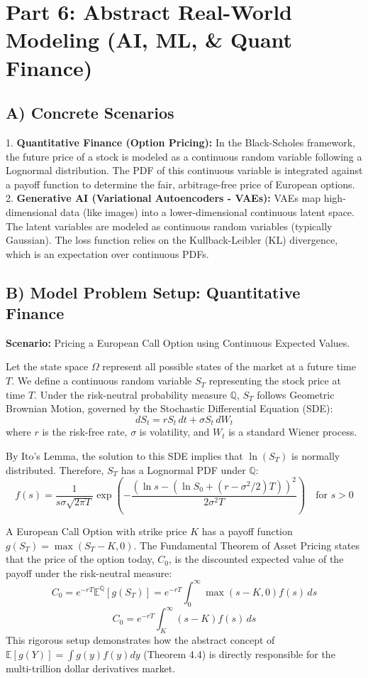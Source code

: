 \documentclass[11pt, a4paper]{article}
\theoremstyle{definition}
\theoremstyle{remark}
\newcommand{\E}{\mathbb{E}}
\begin{document}
\section{Part 6: Abstract Real-World Modeling (AI, ML, \& Quant Finance)}

\subsection{A) Concrete Scenarios}
1. \textbf{Quantitative Finance (Option Pricing):} In the Black-Scholes framework, the future price of a stock is modeled as a continuous random variable following a Lognormal distribution. The PDF of this continuous variable is integrated against a payoff function to determine the fair, arbitrage-free price of European options.
2. \textbf{Generative AI (Variational Autoencoders - VAEs):} VAEs map high-dimensional data (like images) into a lower-dimensional continuous latent space. The latent variables are modeled as continuous random variables (typically Gaussian). The loss function relies on the Kullback-Leibler (KL) divergence, which is an expectation over continuous PDFs.

\subsection{B) Model Problem Setup: Quantitative Finance}
\textbf{Scenario:} Pricing a European Call Option using Continuous Expected Values.

Let the state space $\Omega$ represent all possible states of the market at a future time $T$. We define a continuous random variable $S_T$ representing the stock price at time $T$. Under the risk-neutral probability measure $\mathbb{Q}$, $S_T$ follows Geometric Brownian Motion, governed by the Stochastic Differential Equation (SDE):
\[ dS_t = r S_t \, dt + \sigma S_t \, dW_t \]
where $r$ is the risk-free rate, $\sigma$ is volatility, and $W_t$ is a standard Wiener process.

By Ito's Lemma, the solution to this SDE implies that $\ln(S_T)$ is normally distributed. Therefore, $S_T$ has a Lognormal PDF under $\mathbb{Q}$:
\[ f(s) = \frac{1}{s \sigma \sqrt{2\pi T}} \exp\left( -\frac{(\ln s - (\ln S_0 + (r - \sigma^2/2)T))^2}{2\sigma^2 T} \right) \quad \text{for } s > 0 \]

A European Call Option with strike price $K$ has a payoff function $g(S_T) = \max(S_T - K, 0)$. 
The Fundamental Theorem of Asset Pricing states that the price of the option today, $C_0$, is the discounted expected value of the payoff under the risk-neutral measure:
\[ C_0 = e^{-rT} \E^{\mathbb{Q}}[g(S_T)] = e^{-rT} \int_{0}^{\infty} \max(s - K, 0) f(s) \, ds \]
\[ C_0 = e^{-rT} \int_{K}^{\infty} (s - K) f(s) \, ds \]
This rigorous setup demonstrates how the abstract concept of $\E[g(Y)] = \int g(y)f(y)dy$ (Theorem 4.4) is directly responsible for the multi-trillion dollar derivatives market.
\end{document}
